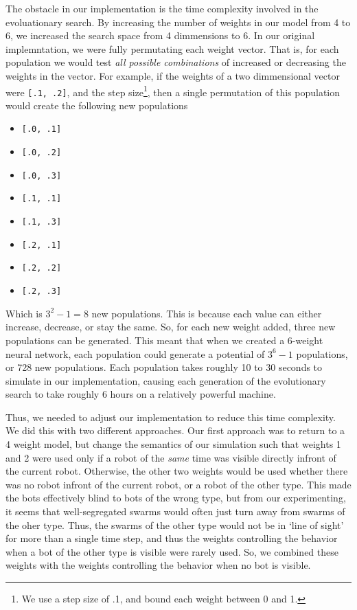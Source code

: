 The obstacle in our implementation is the time complexity involved in the evoluationary search.
By increasing the number of weights in our model from 4 to 6, we increased the search space from 4 dimmensions to 6. 
In our original implemntation, we were fully permutating each weight vector.
That is, for each population we would test \emph{all possible combinations} of increased or decreasing the weights in the vector. 
For example, if the weights of a two dimmensional vector were \texttt{[.1, .2]}, and the step size\footnote{We use a step size of .1, and bound each weight between 0 and 1.}, then a single permutation of this population would create the following new populations
\begin{itemize}
    \item \texttt{[.0, .1]}
    \item \texttt{[.0, .2]}
    \item \texttt{[.0, .3]}
    \item \texttt{[.1, .1]}
    \item \texttt{[.1, .3]}
    \item \texttt{[.2, .1]}
    \item \texttt{[.2, .2]}
    \item \texttt{[.2, .3]}
\end{itemize}

Which is $3^2 - 1 = 8$ new populations. 
This is because each value can either increase, decrease, or stay the same. 
So, for each new weight added, three new populations can be generated. 
This meant that when we created a 6-weight neural network, each population could generate a potential of $3^6 - 1$ populations, or 728 new populations.
Each population takes roughly 10 to 30 seconds to simulate in our implementation, causing each generation of the evolutionary search to take roughly 6 hours on a relatively powerful machine. 

Thus, we needed to adjust our implementation to reduce this time complexity. 
We did this with two different approaches. 
Our first approach was to return to a 4 weight model, but change the semantics of our simulation such that weights 1 and 2 were used only if a robot of the \emph{same} time was visible directly infront of the current robot.
Otherwise, the other two weights would be used whether there was no robot infront of the current robot, or a robot of the other type. 
This made the bots effectively blind to bots of the wrong type, but from our experimenting, it seems that well-segregated swarms would often just turn away from swarms of the oher type.
Thus, the swarms of the other type would not be in `line of sight' for more than a single time step, and thus the weights controlling the behavior when a bot of the other type is visible were rarely used. 
So, we combined these weights with the weights controlling the behavior when no bot is visible. 

